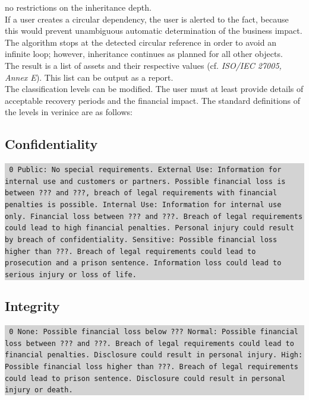 \documentclass[a4paper,10pt]{book}
\begin{document}
no restrictions on the inheritance depth.
\newline\\
If a user creates a circular dependency, the user is alerted to the fact, because this would prevent
unambiguous automatic determination of the business impact. The algorithm stops at the detected circular
reference in order to avoid an infinite loop; however, inheritance continues as planned for all other objects.
\newline\\
The result is a list of assets and their respective values (cf. {\em ISO/IEC 27005, Annex E}). This list can be
output as a report.
\newline\\
The classification levels can be modified. The user must at least provide details of acceptable recovery periods
and the financial impact. The standard definitions of the levels in verinice are as follows:

\subsection{Confidentiality}
\colorbox{lightgray}{\parbox{\textwidth}{
{\tt
0 Public: No special requirements.
\newline{} External Use: Information for internal use and customers or partners.
Possible financial loss is between ??? and ???, breach of legal requirements
with financial penalties is possible.
\newline{} Internal Use: Information for internal use only. Financial loss between ???
and ???. Breach of legal requirements could lead to high financial penalties.
Personal injury could result by breach of confidentiality.
\newline{} Sensitive: Possible financial loss higher than ???. Breach of legal
requirements could lead to prosecution and a prison sentence. Information loss
could lead to serious injury or loss of life.}
}}

\subsection{Integrity}
\colorbox{lightgray}{\parbox{\textwidth}{
{\tt
0 None: Possible financial loss below ???
\newline{} Normal: Possible financial loss between ??? and ???. Breach of legal
requirements could lead to financial penalties. Disclosure could result in
personal injury.
\newline{} High: Possible financial loss higher than ???. Breach of legal requirements
could lead to prison sentence. Disclosure could result in personal injury or
death.}
}}
\end{document}
